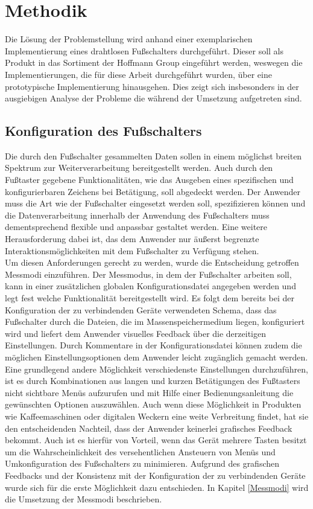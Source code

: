 \section{Methodik}
\label{Methodik}
Die Lösung der Problemstellung wird anhand einer exemplarischen Implementierung eines drahtlosen Fußschalters durchgeführt. Dieser soll als Produkt in das Sortiment der Hoffmann Group eingeführt werden, weswegen die Implementierungen, die für diese Arbeit durchgeführt wurden, über eine prototypische Implementierung hinausgehen. Dies zeigt sich insbesonders in der ausgiebigen Analyse der Probleme die während der Umsetzung aufgetreten sind. 

\subsection{Konfiguration des Fußschalters}
Die durch den Fußschalter gesammelten Daten sollen in einem möglichst breiten Spektrum zur Weiterverarbeitung bereitgestellt werden. Auch durch den Fußtaster gegebene Funktionalitäten, wie das Ausgeben eines spezifischen und konfigurierbaren Zeichens bei Betätigung, soll abgedeckt werden. Der Anwender muss die Art wie der Fußschalter eingesetzt werden soll, spezifizieren können und die Datenverarbeitung innerhalb der Anwendung des Fußschalters muss dementsprechend flexible und anpassbar gestaltet werden. Eine weitere Herausforderung dabei ist, das dem Anwender nur äußerst begrenzte Interaktionsmöglichkeiten mit dem Fußschalter zu Verfügung stehen.\\
Um diesen Anforderungen gerecht zu werden, wurde die Entscheidung getroffen Messmodi einzuführen. Der Messmodus, in dem der Fußschalter arbeiten soll, kann in einer zusätzlichen globalen Konfigurationsdatei angegeben werden und legt fest welche Funktionalität bereitgestellt wird. Es folgt dem bereits bei der Konfiguration der zu verbindenden Geräte verwendeten Schema, dass das Fußschalter durch die Dateien, die im Massenspeichermedium liegen, konfiguriert wird und liefert dem Anwender visuelles Feedback über die derzeitigen Einstellungen. Durch Kommentare in der Konfigurationsdatei können zudem die möglichen Einstellungsoptionen dem Anwender leicht zugänglich gemacht werden.\\
Eine grundlegend andere Möglichkeit verschiedenste Einstellungen durchzuführen, ist es durch Kombinationen aus langen und kurzen Betätigungen des Fußtasters nicht sichtbare Menüs aufzurufen und mit Hilfe einer Bedienungsanleitung die gewünschten Optionen auszuwählen. Auch wenn diese Möglichkeit in Produkten wie Kaffeemaschinen oder digitalen Weckern eine weite Verbreitung findet, hat sie den entscheidenden Nachteil, dass der Anwender keinerlei grafisches Feedback bekommt. Auch ist es hierfür von Vorteil, wenn das Gerät mehrere Tasten besitzt um die Wahrscheinlichkeit des versehentlichen Ansteuern von Menüs und Umkonfiguration des Fußschalters zu minimieren. Aufgrund des grafischen Feedbacks und der Konsistenz mit der Konfiguration der zu verbindenden Geräte wurde sich für die erste Möglichkeit dazu entschieden. In Kapitel \ref{Messmodi} wird die Umsetzung der Messmodi beschrieben.\\
